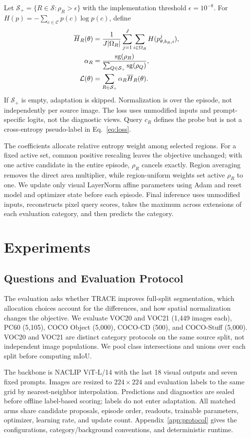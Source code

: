 \documentclass[letterpaper]{article}
\begin{document}
Let $\mathcal S_+=\{R\in\mathcal S:\rho_R>\epsilon\}$ with the implementation threshold $\epsilon=10^{-8}$. For $H(p)=-\sum_{c\in\mathcal C}p(c)\log p(c)$, define
\begin{align}
\overline H_R(\theta)&=\frac{1}{J|\Omega_R|}
\sum_{j=1}^J\sum_{i\in\Omega_R}H(p^j_{\theta,b_R,i}),\\
\alpha_R&=\frac{\operatorname{sg}(\rho_R)}{\sum_{Q\in\mathcal S_+}\operatorname{sg}(\rho_Q)},\\
\mathcal L(\theta)&=\sum_{R\in\mathcal S_+}\alpha_R\overline H_R(\theta).
\label{eq:loss}
\end{align}
If $\mathcal S_+$ is empty, adaptation is skipped. Normalization is over the episode, not independently per source image. The loss uses unmodified inputs and prompt-specific logits, not the diagnostic views. Query $c_R$ defines the probe but is not a cross-entropy pseudo-label in Eq.~\ref{eq:loss}.

The coefficients allocate relative entropy weight among selected regions. For a fixed active set, common positive rescaling leaves the objective unchanged; with one active candidate in the entire episode, $\rho_R$ cancels exactly. Region averaging removes the direct area multiplier, while region-uniform weights set active $\rho_R$ to one. We update only visual LayerNorm affine parameters using Adam and reset model and optimizer state before each episode. Final inference uses unmodified inputs, reconstructs pixel query scores, takes the maximum across extensions of each evaluation category, and then predicts the category.

\section{Experiments}
\subsection{Questions and Evaluation Protocol}
The evaluation asks whether TRACE improves full-split segmentation, which allocation choices account for the differences, and how spatial normalization changes the objective. We evaluate VOC20 and VOC21 (1,449 images each), PC60 (5,105), COCO Object (5,000), COCO-CD (500), and COCO-Stuff (5,000). VOC20 and VOC21 are distinct category protocols on the same source split, not independent image populations. We pool class intersections and unions over each split before computing mIoU.

The backbone is NACLIP ViT-L/14 with the last 18 visual outputs and seven fixed prompts. Images are resized to $224\times224$ and evaluation labels to the same grid by nearest-neighbor interpolation. Predictions and diagnostics are sealed before offline label-based scoring; labels do not enter adaptation. All matched arms share candidate proposals, episode order, readouts, trainable parameters, optimizer, learning rate, and update count. Appendix~\ref{app:protocol} gives the configurations, category/background conventions, and deterministic runtime.
\end{document}

